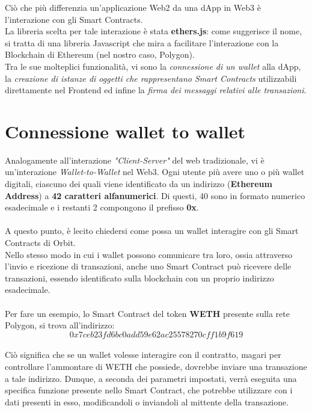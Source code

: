 \documentclass[12pt,a4paper]{report}
\begin{document}
Ciò che più differenzia un'applicazione Web2 da una dApp in Web3 è l'interazione con gli Smart Contracts.\\La libreria scelta per tale interazione è stata \textbf{ethers.js}\cite{ethers}: come suggerisce il nome, si tratta di una libreria Javascript che mira a facilitare l'interazione con la Blockchain di Ethereum (nel nostro caso, Polygon).
\\Tra le sue molteplici funzionalità, vi sono la \textit{connessione di un wallet} alla dApp, la \textit{creazione di istanze di oggetti che rappresentano Smart Contracts} utilizzabili direttamente nel Frontend ed infine la \textit{firma dei messaggi relativi alle transazioni}.

\section{Connessione wallet to wallet}

Analogamente all'interazione \textit{"Client-Server"} del web tradizionale, vi è un'interazione \textit{Wallet-to-Wallet} nel Web3. Ogni utente più avere uno o più wallet digitali, ciascuno dei quali viene identificato da un indirizzo (\textbf{Ethereum Address}) a \textbf{42 caratteri alfanumerici}. Di questi, 40 sono in formato numerico esadecimale e i restanti 2 compongono il prefisso \textbf{0x}.
\\\\A questo punto, è lecito chiedersi come possa un wallet interagire con gli Smart Contracts di Orbit.\\
Nello stesso modo in cui i wallet possono comunicare tra loro, ossia attraverso l'invio e ricezione di transazioni, anche uno Smart Contract può ricevere delle transazioni, essendo identificato sulla blockchain con un proprio indirizzo esadecimale.
\\\\Per fare un esempio, lo Smart Contract del token \textbf{WETH} presente sulla rete Polygon, si trova all'indirizzo:\\
\[ 0x7ceb23fd6bc0add59e62ac25578270cff1b9f619 \]
\\Ciò significa che se un wallet volesse interagire con il contratto, magari per controllare l'ammontare di WETH che possiede, dovrebbe inviare una transazione a tale indirizzo. Dunque, a seconda dei parametri impostati, verrà eseguita una specifica funzione presente nello Smart Contract, che potrebbe utilizzare con i dati presenti in esso, modificandoli o inviandoli al mittente della transazione.
\end{document}
